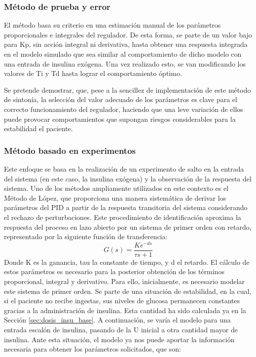 \subsubsection{Método de prueba y error}

El método basa su criterio en una estimación manual de los parámetros proporcionales e integrales del regulador. De esta forma, se parte de un valor bajo para Kp, sin acción integral ni derivativa, hasta obtener una respuesta integrada en el modelo simulado que sea similar al comportamiento de dicho modelo con una entrada de insulina exógena. Una vez realizado esto, se van modificando los valores de Ti y Td hasta lograr el comportamiento óptimo.


Se pretende demostrar, que, pese a la sencillez de implementación de este método de sintonía, la selección del valor adecuado de los parámetros es clave para el correcto funcionamiento del regulador, haciendo que una leve variación de ellos puede provocar comportamientos que supongan riesgos considerables para la estabilidad el paciente.

\subsubsection{Método basado en experimentos}

Este enfoque se basa en la realización de un experimento de salto en la entrada del sistema (en este caso, la insulina exógena) y la observación de la respuesta del sistema. Uno de los métodos ampliamente utilizados en este contexto es el Método de López, que proporciona una manera sistemática de derivar los parámetros del PID a partir de la respuesta transitoria del sistema considerando el rechazo de perturbaciones.
Este procedimiento de identificación aproxima la respuesta del proceso en lazo abierto por un sistema de primer orden con retardo, representado por la siguiente función de transferencia:
\begin{equation}
G(s) = \frac{K e^{-ds}}{\tau s +1}
\label{eq:sist_primer_o_retardo}
\end{equation}
Donde K es la ganancia, tau la constante de tiempo, y d el retardo. El cálculo de estos parámetros es necesario para la posterior obtención de los términos proporcional, integral y derivativo. Para ello, inicialmente, es necesario modelar este sistema de primer orden.
Se parte de una situación de estabilidad, en la cual, si el paciente no recibe ingestas, sus niveles de glucosa permanecen constantes gracias a la administración de insulina. Esta cantidad ha sido calculada ya en la Sección \ref{sec:dosis_insu_base}. 
A continuación, se varía el modelo para una entrada escalón de insulina, pasando de la U inicial a otra cantidad mayor de insulina. Ante esta situación, el modelo ya nos puede aportar la información necesaria para obtener los parámetros solicitados, que son:

